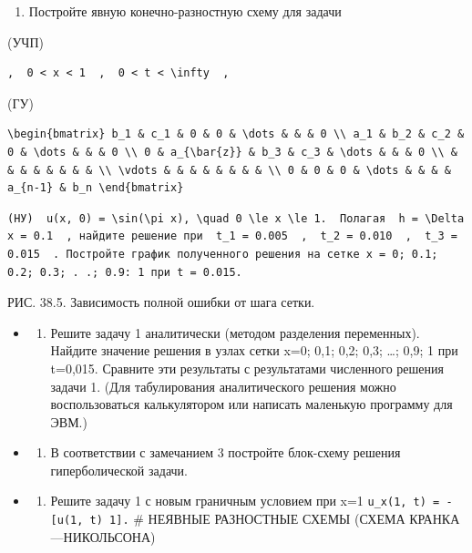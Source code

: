 \documentclass[
  ukrainian,
]{article}
\providecommand{\tightlist}{%
  \setlength{\itemsep}{0pt}\setlength{\parskip}{0pt}}
\begin{document}
\begin{enumerate}
\def\labelenumi{\arabic{enumi}.}
\tightlist
\item
  Постройте явную конечно-разностную схему для задачи
\end{enumerate}

(УЧП)

\begin{verbatim}
,  0 < x < 1  ,  0 < t < \infty  ,
\end{verbatim}

(ГУ)

\begin{verbatim}
\begin{bmatrix} b_1 & c_1 & 0 & 0 & \dots & & & 0 \\ a_1 & b_2 & c_2 & 0 & \dots & & & 0 \\ 0 & a_{\bar{z}} & b_3 & c_3 & \dots & & & 0 \\ & & & & & & & & \\ \vdots & & & & & & & & \\ 0 & 0 & 0 & \dots & & & & a_{n-1} & b_n \end{bmatrix}
\end{verbatim}

\begin{verbatim}
(HУ)  u(x, 0) = \sin(\pi x), \quad 0 \le x \le 1.  Полагая  h = \Delta x = 0.1  , найдите решение при  t_1 = 0.005  ,  t_2 = 0.010  ,  t_3 = 0.015  . Постройте график полученного решения на сетке x = 0; 0.1; 0.2; 0.3; . .; 0.9: 1 при t = 0.015.
\end{verbatim}

РИС. 38.5. Зависимость полной ошибки от шага сетки.

\begin{itemize}
\tightlist
\item
  \begin{enumerate}
  \def\labelenumi{\arabic{enumi}.}
  \setcounter{enumi}{1}
  \tightlist
  \item
    Решите задачу 1 аналитически (методом разделения переменных).
    Найдите значение решения в узлах сетки x=0; 0,1; 0,2; 0,3; \ldots;
    0,9; 1 при t=0,015. Сравните эти результаты с результатами
    численного решения задачи 1. (Для табулирования аналитического
    решения можно воспользоваться калькулятором или написать маленькую
    программу для ЭВМ.)
  \end{enumerate}
\item
  \begin{enumerate}
  \def\labelenumi{\arabic{enumi}.}
  \setcounter{enumi}{2}
  \tightlist
  \item
    В соответствии с замечанием 3 постройте блок-схему решения
    гиперболической задачи.
  \end{enumerate}
\item
  \begin{enumerate}
  \def\labelenumi{\arabic{enumi}.}
  \setcounter{enumi}{3}
  \tightlist
  \item
    Решите задачу 1 с новым граничным условием при x=1
    \texttt{u\_x(1,\ t)\ =\ -{[}u(1,\ t)\ 1{]}.} \# НЕЯВНЫЕ РАЗНОСТНЫЕ
    СХЕМЫ (СХЕМА КРАНКА---НИКОЛЬСОНА)
  \end{enumerate}
\end{itemize}
\end{document}
